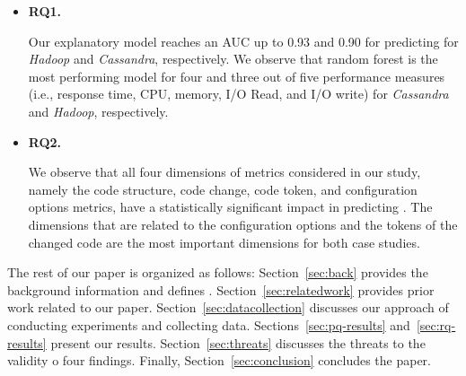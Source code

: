 \begin{itemize}
    
    \item \textbf{RQ1. \RQII}
    
    Our explanatory model reaches an AUC up to 0.93 and 0.90 for predicting \inconsistent for \emph{Hadoop} and \emph{Cassandra}, respectively. We observe that random forest is the most performing model for four and three out of five performance measures (i.e., response time, CPU, memory, I/O Read, and I/O write) for \emph{Cassandra} and \emph{Hadoop}, respectively. 
    
    \item\textbf{RQ2. \RQIII}
    
    We observe that all four dimensions of metrics considered in our study, namely the code structure, code change, code token, and configuration options metrics, have a statistically significant impact in predicting \inconsistent. The dimensions that are related to the configuration options and the tokens of the changed code are the most important dimensions for both case studies. 
    
\end{itemize}

 The rest of our paper is organized as follows: Section~\ref{sec:back} provides the background information and defines \inconsistent. Section~\ref{sec:relatedwork} provides prior work related to our paper. Section~\ref{sec:datacollection} discusses our approach of conducting experiments and collecting data. Sections~\ref{sec:pq-results} and~\ref{sec:rq-results} present our results. Section~\ref{sec:threats} discusses the threats to the validity o four findings. Finally, Section~\ref{sec:conclusion} concludes the paper.


